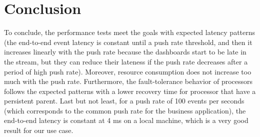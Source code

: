 \section{Conclusion}

To conclude, the performance tests meet the goals with expected latency patterns (the end-to-end event latency is constant until a push rate threshold, and then it increases linearly with the push rate because the dashboards start to be late in the stream, but they can reduce their lateness if the push rate decreases after a period of high push rate). Moreover, resource consumption does not increase too much with the push rate. Furthermore, the fault-tolerance behavior of processors follows the expected patterns with a lower recovery time for processor that have a persistent parent.
Last but not least, for a push rate of 100 events per seconds (which corresponds to the common push rate for the business application), the end-to-end latency is constant at 4 ms on a local machine, which is a very good result for our use case.






